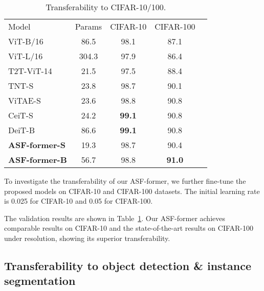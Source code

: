 \documentclass[lettersize,journal]{IEEEtran}
\begin{document}
\setlength{\tabcolsep}{4pt}
\begin{table}
\begin{center}
\caption{Transferability to CIFAR-10/100.}
\label{table:generalization}
\begin{tabular}{lcccc}
\hline\noalign{\smallskip}
Model &Params &CIFAR-10 &CIFAR-100\\
\noalign{\smallskip}
\hline
\noalign{\smallskip}
ViT-B/16 \cite{dosovitskiy2021an} & 86.5 & 98.1 & 87.1\\
ViT-L/16 \cite{dosovitskiy2021an} & 304.3 & 97.9 & 86.4\\
T2T-ViT-14 \cite{yuan2021tokens} &21.5 &97.5 &88.4 \\
TNT-S \cite{tnt} &23.8 &98.7 &90.1\\
ViTAE-S \cite{Xu2021ViTAEVT} &23.6 &98.8 &90.8 \\
CeiT-S \cite{Yuan2021IncorporatingCD}  &24.2 &\textbf{99.1} &90.8\\
DeiT-B \cite{Touvron2021TrainingDI} & 86.6 & \textbf{99.1} & 90.8\\

\midrule
\textbf{ASF-former-S} &19.3 &98.7 &90.4 \\
\textbf{ASF-former-B} &56.7 &98.8 &\textbf{91.0} \\
\hline
\end{tabular}
\end{center}
\end{table}
\setlength{\tabcolsep}{1.4pt}

To investigate the transferability of our ASF-former, we further fine-tune the proposed models on CIFAR-10 and CIFAR-100 datasets. The initial learning rate is 0.025 for CIFAR-10 and 0.05 for CIFAR-100.

The validation results are shown in Table~\ref{table:generalization}. Our ASF-former achieves comparable results on CIFAR-10 and the state-of-the-art results on CIFAR-100 under  resolution, showing its superior transferability.

\subsection{Transferability to object detection \& instance segmentation}
\label{detection}
\end{document}
